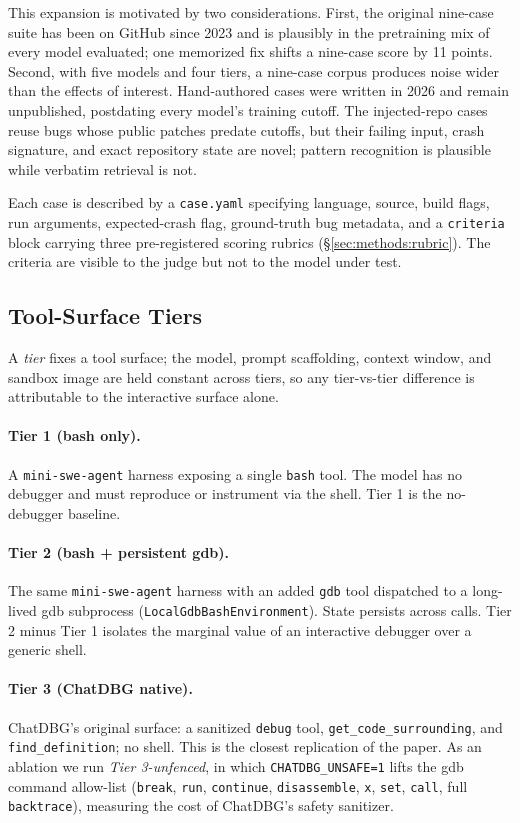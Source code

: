 \documentclass[11pt]{article}
\begin{document}
This expansion is motivated by two considerations. First, the original nine-case suite has been on GitHub since 2023 and is plausibly in the pretraining mix of every model evaluated; one memorized fix shifts a nine-case score by 11 points. Second, with five models and four tiers, a nine-case corpus produces noise wider than the effects of interest. Hand-authored cases were written in 2026 and remain unpublished, postdating every model's training cutoff. The injected-repo cases reuse bugs whose public patches predate cutoffs, but their failing input, crash signature, and exact repository state are novel; pattern recognition is plausible while verbatim retrieval is not.

Each case is described by a \texttt{case.yaml} specifying language, source, build flags, run arguments, expected-crash flag, ground-truth bug metadata, and a \texttt{criteria} block carrying three pre-registered scoring rubrics (\S\ref{sec:methods:rubric}). The criteria are visible to the judge but not to the model under test.

\subsection{Tool-Surface Tiers}
\label{sec:methods:tiers}

A \emph{tier} fixes a tool surface; the model, prompt scaffolding, context window, and sandbox image are held constant across tiers, so any tier-vs-tier difference is attributable to the interactive surface alone.

\paragraph{Tier 1 (bash only).} A \texttt{mini-swe-agent} harness \citep{minisweagent2025} exposing a single \texttt{bash} tool. The model has no debugger and must reproduce or instrument via the shell. Tier 1 is the no-debugger baseline.

\paragraph{Tier 2 (bash + persistent gdb).} The same \texttt{mini-swe-agent} harness with an added \texttt{gdb} tool dispatched to a long-lived gdb subprocess (\texttt{LocalGdbBashEnvironment}). State persists across calls. Tier 2 minus Tier 1 isolates the marginal value of an interactive debugger over a generic shell.

\paragraph{Tier 3 (ChatDBG native).} ChatDBG's original surface: a sanitized \texttt{debug} tool, \texttt{get\_code\_surrounding}, and \texttt{find\_definition}; no shell. This is the closest replication of the paper. As an ablation we run \emph{Tier 3-unfenced}, in which \texttt{CHATDBG\_UNSAFE=1} lifts the gdb command allow-list (\texttt{break}, \texttt{run}, \texttt{continue}, \texttt{disassemble}, \texttt{x}, \texttt{set}, \texttt{call}, full \texttt{backtrace}), measuring the cost of ChatDBG's safety sanitizer.
\end{document}
